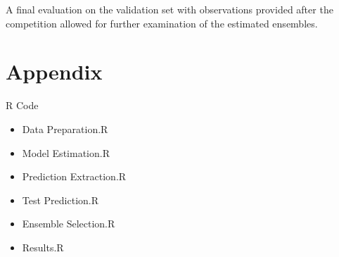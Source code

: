 \documentclass[12pt]{article}
\begin{document}
A final evaluation on the validation set with observations provided after the competition allowed for further examination of the estimated ensembles.\\

\nocite{Caruana2006}
\nocite{Niculescu-Mizil2009}

\newpage
\appendix
\section{Appendix}
R Code

\begin{itemize}
	\item Data Preparation.R
    \item Model Estimation.R
    \item Prediction Extraction.R
    \item Test Prediction.R
    \item Ensemble Selection.R
    \item Results.R
\end{itemize}

\newpage

\newpage

\newpage

\newpage

\newpage

\newpage


\newpage

\end{document}
